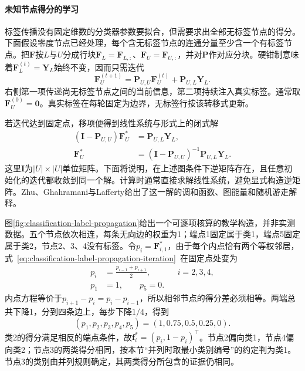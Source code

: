 \paragraph{未知节点得分的学习}
\label{sec:classification-label-propagation-learning}
标签传播没有固定维数的分类器参数要拟合，但需要求出全部无标签节点的得分。下面假设零度节点已经处理，每个含无标签节点的连通分量至少含一个有标签节点。把$\bm{F}$按$L$与$U$分成行块$\bm{F}_L=\bm{F}_{L,:}$、$\bm{F}_U=\bm{F}_{U,:}$，并对$\bm{P}$作对应分块。硬钳制意味着$\bm{F}_L^{(t)}=\bm{Y}_L$始终不变，因而只需迭代
\begin{equation}
  \label{eq:classification-label-propagation-iteration}
  \bm{F}_U^{(t+1)}
    =\bm{P}_{U,U}\bm{F}_U^{(t)}
     +\bm{P}_{U,L}\bm{Y}_L.
\end{equation}
右侧第一项传递尚无标签节点之间的当前信息，第二项持续注入真实标签。通常取$\bm{F}_U^{(0)}=\bm{0}$。真实标签在每轮固定为边界，无标签行按该转移式更新。

若迭代达到固定点，移项便得到线性系统与形式上的闭式解
\begin{equation}
  \label{eq:classification-label-propagation-solution}
  \begin{aligned}
    (\bm{I}-\bm{P}_{U,U})\bm{F}_U^\ast
      &=\bm{P}_{U,L}\bm{Y}_L,\\
    \bm{F}_U^\ast
      &=(\bm{I}-\bm{P}_{U,U})^{-1}
        \bm{P}_{U,L}\bm{Y}_L.
  \end{aligned}
\end{equation}
这里$\bm{I}$为$|U|\times|U|$单位矩阵。下面将说明，在上述图条件下逆矩阵存在，且任意初始化的迭代都收敛到同一个解。计算时通常直接求解线性系统，避免显式构造逆矩阵。Zhu、Ghahramani与Lafferty给出了这一解的调和函数、图能量和随机游走解释。

图\ref{fig:classification-label-propagation}给出一个可逐项核算的教学构造，并非实测数据。五个节点依次相连，每条无向边的权重为1；端点1固定属于类1，端点5固定属于类2，节点2、3、4没有标签。令$p_i=\bm{F}_{i,1}^\ast$，由于每个内点恰有两个等权邻居，式~\eqref{eq:classification-label-propagation-iteration}~在固定点处变为
\begin{equation}
  \label{eq:classification-label-propagation-path}
  \begin{aligned}
    p_i&=\frac{p_{i-1}+p_{i+1}}{2},
      &&i=2,3,4,\\
    p_1&=1,\qquad p_5=0.
  \end{aligned}
\end{equation}
内点方程等价于$p_{i+1}-p_i=p_i-p_{i-1}$，所以相邻节点的得分差必须相等。两端总共下降1，分到四条边上，每步下降$1/4$，得到
\[
  (p_1,p_2,p_3,p_4,p_5)
    =(1,0.75,0.5,0.25,0).
\]
类2的得分满足相反的端点条件，故$\bm{f}_i^\ast=(p_i,1-p_i)^\top$。节点2偏向类1，节点4偏向类2；节点3的两类得分相同，按本节“并列时取最小类别编号”的约定判为类1。节点3的类别由并列规则确定，其两类得分所包含的证据仍相同。

